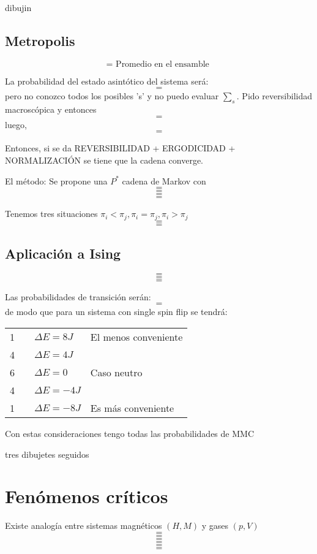 \documentclass[10pt,oneside]{CBFT_book}
\begin{document}
dibujin

\subsection{Metropolis}

\[= \text{ Promedio en el ensamble } \]

La probabilidad del estado asintótico del sistema será:
\[=\]
pero no conozco todos los posibles 's' y no puedo evaluar $\sum_s$.
Pido reversibilidad macroscópica y entonces
\[=\]
luego,
\[=\]

Entonces, si se da 
REVERSIBILIDAD + ERGODICIDAD + NORMALIZACIÓN
se tiene que la cadena converge.

El método:
Se propone una $P^*$ cadena de Markov con 
\[=\]
\[=\]
\[=\]
\[=\]

Tenemos tres situaciones $ \pi_i < \pi_j , \pi_i = \pi_j, \pi_i > \pi_j$
\[=\]
\[=\]

\subsection{Aplicación a Ising}

\[=\]
\[=\]
\[=\]

Las probabilidades de transición serán:
\[=\]
de modo que para un sistema con single spin flip se tendrá:
\begin{center}
\begin{tabular}{llll}
1 &  & $ \Delta E = 8J $  & El menos conveniente \\
4 &  & $ \Delta E = 4J $ &  \\
6 &  & $ \Delta E = 0 $ & Caso neutro \\
4 &  & $ \Delta E = -4J $ &  \\
1 &  & $ \Delta E = -8J $ & Es más conveniente
\end{tabular}
\end{center}

Con estas consideraciones tengo todas las probabilidades de MMC

tres dibujetes seguidos

\section{Fenómenos críticos}

Existe analogía entre sistemas magnéticos $(H,M)$ y gases $(p,V)$
\[=\]
\[=\]
\[=\]
\[=\]
\[=\]
\[=\]
\end{document}
